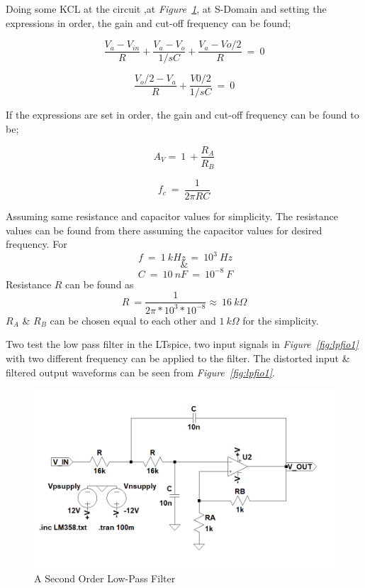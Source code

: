 \documentclass[paper]{IEEEtran}
\begin{document}
	
	Doing some KCL at the circuit ,at \textit{Figure~\ref{fig:lpf}}, at S-Domain and setting the expressions in order, the gain and cut-off frequency can be found;
	
	
	$$ \frac{V_a - V_{in}}{R}+\frac{V_a-V_o}{1/sC}+\frac{V_a-Vo/2}{R} ~=~0$$
	
	$$ \frac{V_o/2-V_a}{R}+\frac{V0/2}{1/sC} ~=~0	 $$
	
	If the expressions are set in order, the gain and cut-off frequency can be found to be;
	
	$$ A_V = ~1~+ \frac{R_A}{R_B} $$

	$$	f_c ~=~ \frac{1}{2\pi RC}	$$
	
	Assuming same resistance and capacitor values for simplicity. The resistance values can be found from there assuming the capacitor values for desired frequency. For 
	$$~f~=~1~kHz~=~10^3~Hz $$ 
	$$ \& $$ 
	$$~C~=~10~nF~=~10^{-8}~F$$
	Resistance $R$ can be found as
	$$ R~=\frac{1}{2\pi*10^3*10^{-8}}\approx~16~k\Omega $$
	$R_A$ \& $R_B$ can be chosen equal to each other and $1~k\Omega$ for the simplicity.

	 Two test the low pass filter in the LTspice, two input signals in \textit{Figure~\ref{fig:lpfio1}} with two different frequency can be applied to the filter. The distorted input \& filtered output waveforms can be seen from \textit{Figure~\ref{fig:lpfio1}}.


\begin{figure}[h!]
	\setlength{\unitlength}{\textwidth}
	\center 
	\includegraphics[width=0.5\unitlength]{lpf_v2.png}
	\caption{\label{fig:lpf}A Second Order Low-Pass Filter }
\end{figure} 
	
\end{document}
